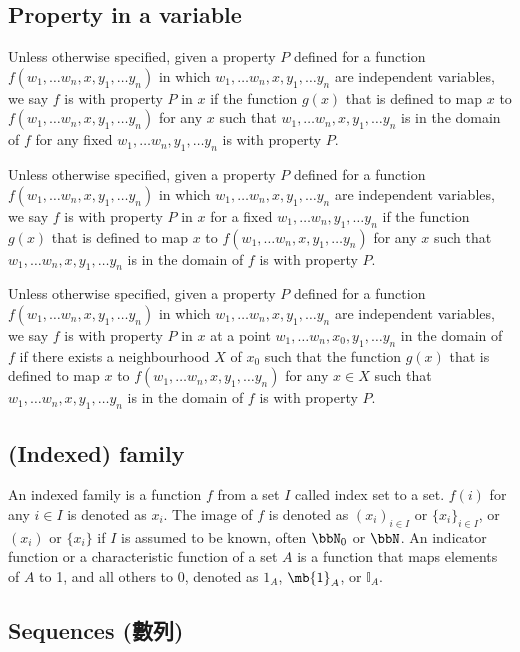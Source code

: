 \subsection{Property in a variable}
Unless otherwise specified, given a property $P$ defined for a function $f(w_1,\dots w_n,x,y_1,\dots y_n)$ in which $w_1,\dots w_n,x,y_1,\dots y_n$ are independent variables, we say $f$ is with property $P$ in $x$ if the function $g(x)$ that is defined to map $x$ to $f(w_1,\dots w_n,x,y_1,\dots y_n)$ for any $x$ such that $w_1,\dots w_n,x,y_1,\dots y_n$ is in the domain of $f$ for any fixed $w_1,\dots w_n,y_1,\dots y_n$ is with property $P$.

Unless otherwise specified, given a property $P$ defined for a function $f(w_1,\dots w_n,x,y_1,\dots y_n)$ in which $w_1,\dots w_n,x,y_1,\dots y_n$ are independent variables, we say $f$ is with property $P$ in $x$ for a fixed $w_1,\dots w_n,y_1,\dots y_n$ if the function $g(x)$ that is defined to map $x$ to $f(w_1,\dots w_n,x,y_1,\dots y_n)$ for any $x$ such that $w_1,\dots w_n,x,y_1,\dots y_n$ is in the domain of $f$ is with property $P$.

Unless otherwise specified, given a property $P$ defined for a function $f(w_1,\dots w_n,x,y_1,\dots y_n)$ in which $w_1,\dots w_n,x,y_1,\dots y_n$ are independent variables, we say $f$ is with property $P$ in $x$ at a point $w_1,\dots w_n,x_0,y_1,\dots y_n$ in the domain of $f$ if there exists a neighbourhood $X$ of $x_0$ such that the function $g(x)$ that is defined to map $x$ to $f(w_1,\dots w_n,x,y_1,\dots y_n)$ for any $x\in X$ such that $w_1,\dots w_n,x,y_1,\dots y_n$ is in the domain of $f$ is with property $P$.
\subsection{(Indexed) family}
An indexed family is a function $f$ from a set $I$ called index set to a set. $f(i)$ for any $i\in I$ is denoted as $x_i$. The image of $f$ is denoted as $(x_i)_{i\in I}$ or $\{x_i\}_{i\in I}$, or $(x_i)$ or $\{x_i\}$ if $I$ is assumed to be known, often $\bbN_0$ or $\bbN$.
An indicator function or a characteristic function of a set $A$ is a function that maps elements of $A$ to 1, and all others to 0, denoted as $1_A$, $\mb{1}_A$, or $\mathds{I}_A$.
\subsection{Sequences (數列)}
